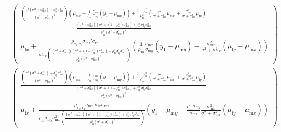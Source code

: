 \documentclass{article}
\newcommand{\x}[1]{\text{#1}}
\begin{document}
\begin{landscape}
\begin{align*}
\\&=\left(\begin{array}{cc}\frac{\left(\frac{\sigma^2(\sigma^2+\sigma_{\x{m}x}^2)+\sigma_{\x{f}y}^2\sigma_{\x{m}x}^2}{(\sigma^2+\sigma_{\x{m}x}^2)^2}\right)\left(\mu_{\x{m}x}+\frac{1}{\rho_\x{m}}\frac{\sigma_{\x{m}x}}{\sigma_{\x{m}y}}(y_1-\mu_{\x{m}y})\right)+\frac{1-\rho_\x{m}^2}{\rho_\x{m}^2}\left(\frac{\sigma^2}{\sigma^2+\sigma_{\x{m}x}^2}\mu_{\x{m}x}+\frac{\sigma_{\x{m}x}^2}{\sigma^2+\sigma_{\x{m}x}^2}\mu_{\x{f}y}\right)}{\frac{(\sigma^2+\sigma_{\x{m}x}^2)(\sigma^2+(1-\rho_\x{m}^2)\sigma_{\x{m}x}^2)+\rho_\x{m}^2\sigma_{\x{f}y}^2\sigma_{\x{m}x}^2}{\rho_\x{m}^2(\sigma^2+\sigma_{\x{m}x}^2)^2}} \\ \mu_{\x{f}x}+\frac{\rho_{x_1,x_2}\sigma_{\x{m}x}'\sigma_{\x{f}x}}{\sigma_{\x{m}x}^2\left(\frac{(\sigma^2+\sigma_{\x{m}x}^2)(\sigma^2+(1-\rho_\x{m}^2)\sigma_{\x{m}x}^2)+\rho_\x{m}^2\sigma_{\x{f}y}^2\sigma_{\x{m}x}^2}{\rho_\x{m}^2(\sigma^2+\sigma_{\x{m}x}^2)^2}\right)}\left(\frac{1}{\rho_\x{m}}\frac{\sigma_{\x{m}x}}{\sigma_{\x{m}y}}(y_1-\mu_{\x{m}y})-\frac{\sigma_{\x{m}x}^2}{\sigma^2+\sigma_{\x{m}x}^2}\left(\mu_{\x{f}y}-\mu_{\x{m}x}\right)\right) \end{array}\right)
\\&=\left(\begin{array}{cc}\frac{\left(\frac{\sigma^2(\sigma^2+\sigma_{\x{m}x}^2)+\sigma_{\x{f}y}^2\sigma_{\x{m}x}^2}{(\sigma^2+\sigma_{\x{m}x}^2)^2}\right)\left(\mu_{\x{m}x}+\frac{1}{\rho_\x{m}}\frac{\sigma_{\x{m}x}}{\sigma_{\x{m}y}}(y_1-\mu_{\x{m}y})\right)+\frac{1-\rho_\x{m}^2}{\rho_\x{m}^2}\left(\frac{\sigma^2}{\sigma^2+\sigma_{\x{m}x}^2}\mu_{\x{m}x}+\frac{\sigma_{\x{m}x}^2}{\sigma^2+\sigma_{\x{m}x}^2}\mu_{\x{f}y}\right)}{\frac{(\sigma^2+\sigma_{\x{m}x}^2)(\sigma^2+(1-\rho_\x{m}^2)\sigma_{\x{m}x}^2)+\rho_\x{m}^2\sigma_{\x{f}y}^2\sigma_{\x{m}x}^2}{\rho_\x{m}^2(\sigma^2+\sigma_{\x{m}x}^2)^2}} \\ \mu_{\x{f}x}+\frac{\rho_{x_1,x_2}\sigma_{\x{m}x}'\sigma_{\x{f}x}\sigma_{\x{m}x}}{\rho_\x{m}\sigma_{\x{m}y}\sigma_{\x{m}x}^2\left(\frac{(\sigma^2+\sigma_{\x{m}x}^2)(\sigma^2+(1-\rho_\x{m}^2)\sigma_{\x{m}x}^2)+\rho_\x{m}^2\sigma_{\x{f}y}^2\sigma_{\x{m}x}^2}{\rho_\x{m}^2(\sigma^2+\sigma_{\x{m}x}^2)^2}\right)}\left(y_1-\mu_{\x{m}y}-\frac{\rho_\x{m}\sigma_{\x{m}y}}{\sigma_{\x{m}x}}\frac{\sigma_{\x{m}x}^2}{\sigma^2+\sigma_{\x{m}x}^2}\left(\mu_{\x{f}y}-\mu_{\x{m}x}\right)\right) \end{array}\right)

\end{align*}
\end{landscape}
\end{document}
